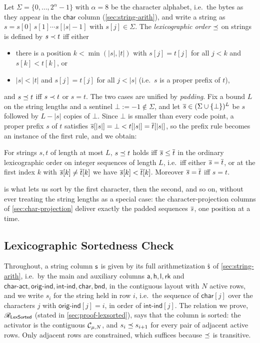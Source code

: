 Let $\Sigma = \{0, \dots, 2^{\alpha}-1\}$ with $\alpha = 8$ be the character alphabet, i.e.\ the bytes as they appear in the $\mathsf{char}$ column (\cref{sec:string-arith}), and write a string as $s = s[0]\,s[1] \cdots s[|s|-1]$ with $s[j] \in \Sigma$. The \emph{lexicographic order} $\preceq$ on strings is defined by $s \prec t$ iff either
\begin{itemize}[nosep]
  \item there is a position $k < \min(|s|, |t|)$ with $s[j] = t[j]$ for all $j < k$ and $s[k] < t[k]$, or
  \item $|s| < |t|$ and $s[j] = t[j]$ for all $j < |s|$ (i.e.\ $s$ is a proper prefix of $t$),
\end{itemize}
and $s \preceq t$ iff $s \prec t$ or $s = t$. The two cases are unified by \emph{padding}. Fix a bound $L$ on the string lengths and a sentinel $\bot := -1 \notin \Sigma$, and let $\overline{s} \in (\Sigma \cup \{\bot\})^{L}$ be $s$ followed by $L - |s|$ copies of $\bot$. Since $\bot$ is smaller than every code point, a proper prefix $s$ of $t$ satisfies $\overline{s}[|s|] = \bot < t[|s|] = \overline{t}[|s|]$, so the prefix rule becomes an instance of the first rule, and we obtain:
\begin{lemma}\label{lem:padded-lex}
  For strings $s, t$ of length at most $L$, $s \preceq t$ holds iff $\overline{s} \le \overline{t}$ in the ordinary lexicographic order on integer sequences of length $L$, i.e.\ iff either $\overline{s} = \overline{t}$, or at the first index $k$ with $\overline{s}[k] \ne \overline{t}[k]$ we have $\overline{s}[k] < \overline{t}[k]$. Moreover $\overline{s} = \overline{t}$ iff $s = t$.
\end{lemma}
 is what lets us sort by the first character, then the second, and so on, without ever treating the string lengths as a special case: the character-projection columns of \cref{sec:char-projection} deliver exactly the padded sequences $\overline{s}$, one position at a time.

\subsection{Lexicographic Sortedness Check}
\label{sec:lex-sorted-check}

Throughout, a string column $\mathsf{s}$ is given by its full arithmetization $\hat{\mathsf{s}}$ of \cref{sec:string-arith}, i.e.\ by the main and auxiliary columns $\mathsf{a}, \mathsf{h}, \mathsf{l}, \mathsf{rk}$ and $\mathsf{char\text{-}act}, \mathsf{orig\text{-}ind}, \mathsf{int\text{-}ind}, \mathsf{char}, \mathsf{bnd}$, in the contiguous layout with $N$ active rows, and we write $s_i$ for the string held in row $i$, i.e.\ the sequence of $\mathsf{char}[j]$ over the characters $j$ with $\mathsf{orig\text{-}ind}[j] = i$, in order of $\mathsf{int\text{-}ind}[j]$. The relation we prove, $\mathscr{R}_{\mathsf{LexSorted}}$ (stated in \cref{sec:proof-lexsorted}), says that the column is sorted: the activator is the contiguous $\mathcal{C}_{\mu,N}$, and $s_i \preceq s_{i+1}$ for every pair of adjacent active rows. Only adjacent rows are constrained, which suffices because $\preceq$ is transitive.

